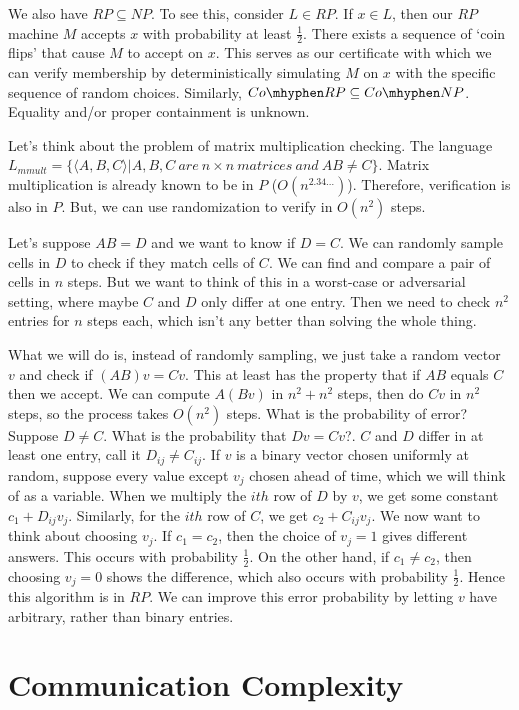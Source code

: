 We also have $RP\subseteq NP$.  To see this, consider $L\in RP$.  If $x\in L$, then our $RP$ machine $M$ accepts $x$ with probability at least $\frac{1}{2}$.  There exists a sequence of `coin flips' that cause $M$ to accept on $x$.  This serves as our certificate with which we can verify membership by deterministically simulating $M$ on $x$ with the specific sequence of random choices.  Similarly, $Co\mhyphen RP \subseteq Co\mhyphen NP$.  Equality and/or proper containment is unknown.

Let's think about the problem of matrix multiplication checking.  The language 
$L_{mmult}=\{\langle A,B,C\rangle | A,B,C \ are \ n\times n \ matrices \ and \ AB\neq C\}$.  Matrix multiplication is already known to be in $P$ ($O(n^{2.34\dots})$).  Therefore, verification is also in $P$.  But, we can use randomization to verify in $O(n^2)$ steps.

Let's suppose $AB=D$ and we want to know if $D=C$.  We can randomly sample cells in $D$ to check if they match cells of $C$.  We can find and compare a pair of cells in $n$ steps.  But we want to think of this in a worst-case or adversarial setting, where maybe $C$ and $D$ only differ at one entry.  Then we need to check $n^2$ entries for $n$ steps each, which isn't any better than solving the whole thing.  

What we will do is, instead of randomly sampling, we just take a random vector $v$ and check if $(AB)v = Cv$.  This at least has the property that if $AB$ equals $C$ then we accept.  We can compute $A(Bv)$ in $n^2 + n^2$ steps, then do $Cv$ in $n^2$ steps, so the process takes $O(n^2)$ steps.  What is the probability of error?  Suppose $D\neq C$. What is the probability that $Dv=Cv$?.  $C$ and $D$ differ in at least one entry, call it $D_{ij}\neq C_{ij}$.  If $v$ is a binary vector chosen uniformly at random, suppose every value except $v_j$ chosen ahead of time, which we will think of as a variable.  When we multiply the $ith$ row of $D$ by $v$, we get some constant $c_1 + D_{ij}v_j$.  Similarly, for the $ith$ row of $C$, we get $c_2 + C_{ij}v_j$.  We now want to think about choosing $v_j$.  If $c_1 = c_2$, then the choice of $v_j=1$ gives different answers.  This occurs with probability $\frac{1}{2}$.  On the other hand, if $c_1\neq c_2$, then choosing $v_j=0$ shows the difference, which also occurs with probability $\frac{1}{2}$.  Hence this algorithm is in $RP$.  We can improve this error probability by letting $v$ have arbitrary, rather than binary entries.


\section*{Communication Complexity}


